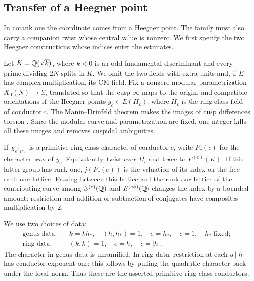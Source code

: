 \subsection{Transfer of a Heegner point}
\label{sec:h:statements}

In corank one the coordinate comes from a Heegner point. The family
must also carry a companion twist whose central value is nonzero.
We first specify the two Heegner constructions whose indices enter
the estimates.

Let $K=\mathbb Q(\sqrt{k})$, where $k<0$ is an odd fundamental discriminant and
every prime dividing $2N$ splits in $K$. We omit the two fields with extra
units and, if $E$ has complex multiplication, its CM field. Fix a nonzero modular parametrization $X_0(N)\to E$, translated so
that the cusp $\infty$ maps to the origin, and compatible orientations
of the Heegner points $y_c\in E(H_c)$, where $H_c$ is the ring class
field of conductor $c$. The Manin--Drinfeld theorem makes the images of
cusp differences torsion \citep[Section~1]{Drinfeld1973}. Since the
modular curve and parametrization are fixed, one integer kills all
these images and removes cuspidal ambiguities.

If $\chi_e|_{G_K}$ is a primitive ring class character of conductor $c$,
write $P_c(e)$ for the character \emph{sum} of $y_c$. Equivalently, twist
over $H_c$ and trace to $E^{(e)}(K)$. If this latter group has rank one,
$j(P_c(e))$ is the valuation of its index on the free rank-one lattice.
Passing between this lattice and the rank-one lattice of the contributing
curve among $E^{(e)}(\mathbb Q)$ and $E^{(ek)}(\mathbb Q)$ changes the index by a bounded
amount: restriction and addition or subtraction of conjugates have
composites multiplication by $2$.

We use two choices of data:
\begin{align*}
 \text{genus data:}\quad& k=h h_*,\quad (h,h_*)=1,
                         \quad e=h_*,\quad c=1,
                         \quad h_*\text{ fixed};\\
 \text{ring data:}\quad& (k,h)=1,\quad e=h,\quad c=|h|.
\end{align*}
The character in genus data is unramified. In ring data, restriction at
each $q\mid h$ has conductor exponent one: this follows by pulling the
quadratic character back under the local norm. Thus these are the asserted
primitive ring class conductors.

